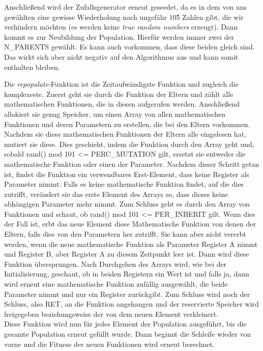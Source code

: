 \documentclass[a4paper,12pt]{article}
\begin{document}
\noindent Anschließend wird der Zufallsgenerator erneut geseedet, da es in dem von uns gewählten eine gewisse Wiederholung nach ungefähr 10\^5 Zahlen gibt, die wir verhindern möchten (es werden keine \emph{true random numbers} erzeugt). Dann kommt es zur Neubildung der Population. Hierfür werden immer zwei der N\_PARENTS gewählt. Es kann auch vorkommen, dass diese beiden gleich sind. Das wirkt sich aber nicht negativ auf den Algorithmus aus und kann somit enthalten bleiben. 

\noindent Die \emph{repopulate}-Funktion ist die Zeitaufwändigste Funktion und zugleich die komplexeste. Zuerst geht sie durch die Funktion der Eltern und zählt alle mathematischen Funktionen, die in diesen aufgerufen werden. Anschließend allokiert sie genug Speicher, um einen Array von allen mathematischen Funktionen und deren Parametern zu erstellen, die bei den Eltern vorkommen. Nachdem sie diese mathematischen Funktionen der Eltern alle eingelesen hat, mutiert sie diese. Dies geschieht, indem die Funktion durch den Array geht und, sobald rand() mod 101 <= PERC\_MUTATION gilt, ersetzt sie entweder die mathematische Funktion oder einen der Parameter. Nachdem dieser Schritt getan ist, findet die Funktion ein verwendbares Erst-Element, dass keine Register als Parameter nimmt. Falls es keine mathematische Funktion findet, auf die dies zutrifft, verändert sie das erste Element des Arrays so, dass dieses keine abhängigen Parameter mehr nimmt. Zum Schluss geht es durch den Array von Funktionen und schaut, ob rand() mod 101 <= PER\_INHERIT gilt. Wenn dies der Fall ist, erbt das neue Element diese Mathematische Funktion von denen der Eltern, falls dies von den Parametern her zutrifft. Sie kann aber nicht vererbt werden, wenn die neue mathematische Funktion als Parameter Register A nimmt und Register B, aber Register A zu diesem Zeitpunkt leer ist. Dann wird diese Funktion übersprungen. Nach Durchgehen des Arrays wird, wie bei der Initialisierung, geschaut, ob in beiden Registern ein Wert ist und falls ja, dann wird erneut eine mathematische Funktion zufällig ausgewählt, die beide Parameter nimmt und nur ein Register zurückgibt. Zum Schluss wird noch der Schluss, also RET, an die Funktion angehangen und der reservierte Speicher wird freigegeben beziehungsweise der von dem neuen Element verkleinert. \\

\noindent Diese Funktion wird nun für jedes Element der Population ausgeführt, bis die gesamte Population erneut gefüllt wurde. Dann beginnt die Schleife wieder von vorne und die Fitness der neuen Funktionen wird erneut berechnet. \\
\newpage 
\end{document}
